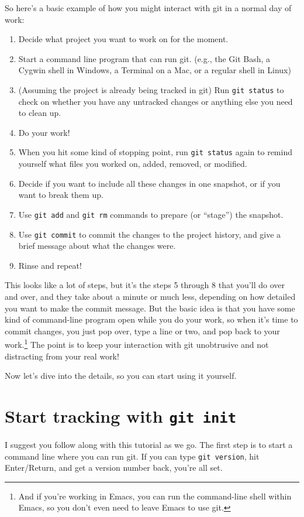 \documentclass{article}
\begin{document}
So here's a basic example of how you might interact with git in a normal day of work:
\begin{enumerate}
\item Decide what project you want to work on for the moment.
\item Start a command line program that can run git. (e.g., the Git Bash, a Cygwin shell in Windows, a Terminal on a Mac, or a regular shell in Linux)
\item (Assuming the project is already being tracked in git) Run \texttt{git status} to check on whether you have any untracked changes or anything else you need to clean up.
\item Do your work!
\item When you hit some kind of stopping point, run \texttt{git status} again to remind yourself what files you worked on, added, removed, or modified.
\item Decide if you want to include all these changes in one snapshot, or if you want to break them up.
\item Use \texttt{git add} and \texttt{git rm} commands to prepare (or ``stage'') the snapshot.
\item Use \texttt{git commit} to commit the changes to the project history, and give a brief message about what the changes were.
\item Rinse and repeat!
\end{enumerate}

This looks like a lot of steps, but it's the steps 5 through 8 that you'll do over and over, and they take about a minute or much less, depending on how detailed you want to make the commit message.  But the basic idea is that you have some kind of command-line program open while you do your work, so when it's time to commit changes, you just pop over, type a line or two, and pop back to your work.\footnote{And if you're working in Emacs, you can run the command-line shell within Emacs, so you don't even need to leave Emacs to use git.
 } The point is to keep your interaction with git unobtrusive and not distracting from your real work!

Now let's dive into the details, so you can start using it yourself.
\section{Start tracking with \texttt{git init}}
\label{sec-5}

I suggest you follow along with this tutorial as we go. The first step is to start a command line where you can run git.  If you can type \texttt{git version}, hit Enter/Return, and get a version number back, you're all set.
\end{document}
